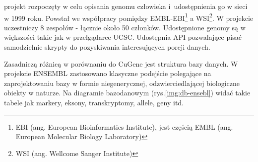 \begin{itemize}
	projekt rozpoczęty w celu opisania genomu człowieka i~udostępnienia go w sieci w 1999 roku. Powstał we współpracy pomiędzy EMBL-EBI\footnote{EBI (ang. European Bioinformatics Institute), jest częścią EMBL (ang. European Molecular Biology Laboratory)} a WSI\footnote{WSI (ang. Wellcome Sanger Institute)}. W projekcie uczestniczy 8 zespołów - łącznie około 50 członków. Udostępnione genomy są w większości takie jak w przelgądarce UCSC. Udostępnia API pozwalające pisać samodzielnie skrypty do pozyskiwania interesujących porcji danych.
	
	Zasadniczą różnicą w porównaniu do CuGene jest struktura bazy danych. W projekcie ENSEMBL zastosowano klasyczne podejście polegające na zaprojektowaniu bazy w formie niegenerycznej, odzwierciedlającej biologiczne obiekty w naturze. Na diagramie bazodanowym (rys.\ref{img:db-ensebl}) widać takie tabele jak markery, eksony, transkryptomy, allele, geny itd.
	

\end{itemize}
